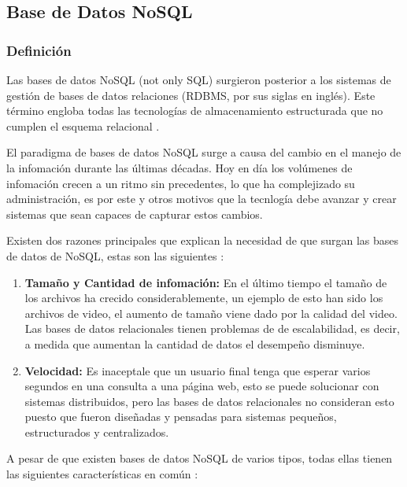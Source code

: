 
\subsection{Base de Datos NoSQL}

\subsubsection{Definición}
Las bases de datos NoSQL (not only SQL) surgieron posterior a los sistemas de gestión de bases de datos relaciones (RDBMS, por sus siglas en inglés). Este término engloba todas las tecnologías de almacenamiento estructurada que no cumplen el esquema relacional \cite{del2013bases}.

El paradigma de bases de datos NoSQL surge a causa del cambio en el manejo de la infomación durante las últimas décadas. Hoy en día los volúmenes de infomación crecen a un ritmo sin precedentes, lo que ha complejizado su administración, es por este y otros motivos que la tecnlogía debe avanzar y crear sistemas que sean capaces de capturar estos cambios.

Existen dos razones principales que explican la necesidad de que surgan las bases de datos de NoSQL, estas son las siguientes \cite{romero2012utilidad}:

\begin{enumerate}
  \item \textbf{Tamaño y Cantidad de infomación:}  En el último tiempo el tamaño de los archivos ha crecido considerablemente, un ejemplo de esto han sido los archivos de video, el aumento de tamaño viene dado por la calidad del video. Las bases de datos relacionales tienen problemas de de escalabilidad, es decir, a medida que aumentan la cantidad de datos el desempeño disminuye.
  \item \textbf{Velocidad:} Es inaceptale que un usuario final tenga que esperar varios segundos en una consulta a una página web, esto se puede solucionar con sistemas distribuidos, pero las bases de datos relacionales no consideran esto puesto que fueron diseñadas y pensadas para sistemas pequeños, estructurados y centralizados.
\end{enumerate}

A pesar de que existen bases de datos NoSQL de varios tipos, todas ellas tienen las siguientes características en común \cite{romero2012utilidad}:

